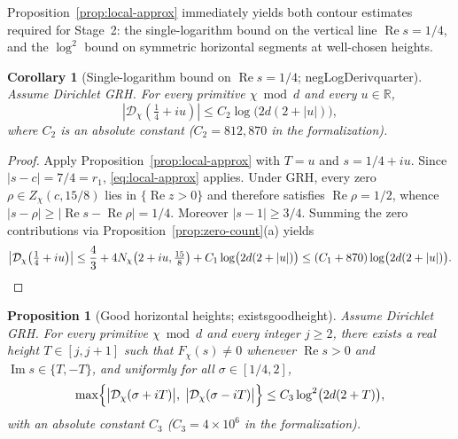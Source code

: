 \documentclass[11pt,reqno]{amsart}
\numberwithin{equation}{section}
\newtheorem{proposition}[theorem]{Proposition}
\newtheorem{corollary}[theorem]{Corollary}
\theoremstyle{definition}
\newcommand{\R}{\mathbb{R}}
\newcommand{\1}{\mathbf{1}}
\newcommand{\D}{\mathcal{D}}
\renewcommand{\Re}{\operatorname{Re}}
\renewcommand{\Im}{\operatorname{Im}}
\newcommand{\lean}[1]{{\footnotesize\ttfamily\renewcommand{\_}{\textunderscore\allowbreak}#1}}
\newcommand{\GRH}{\textup{GRH}}
\begin{document}
Proposition~\ref{prop:local-approx} immediately yields both contour estimates required for Stage~2: the single-logarithm bound on the vertical line $\Re s = 1/4$, and the $\log^2$ bound on symmetric horizontal segments at well-chosen heights.

\begin{corollary}[Single-logarithm bound on $\Re s = 1/4$; \lean{negLogDeriv\_quarter}]
\label{cor:quarter-line}
Assume Dirichlet \GRH{}. For every primitive $\chi \bmod d$ and every $u \in \R$,
\begin{equation}\label{eq:quarter-line}
  \left|\D_\chi\!\left(\tfrac{1}{4} + i u\right)\right| \le C_2 \log\bigl(2 d (2 + |u|)\bigr),
\end{equation}
where $C_2$ is an absolute constant ($C_2 = 812{,}870$ in the formalization).
\end{corollary}

\begin{proof}
Apply Proposition~\ref{prop:local-approx} with $T = u$ and $s = 1/4 + iu$. Since $|s - c| = 7/4 = r_1$, \eqref{eq:local-approx} applies. Under \GRH{}, every zero $\rho \in Z_\chi(c, 15/8)$ lies in $\{\Re z > 0\}$ and therefore satisfies $\Re \rho = 1/2$, whence $|s - \rho| \ge |\Re s - \Re \rho| = 1/4$. Moreover $|s - 1| \ge 3/4$. Summing the zero contributions via Proposition~\ref{prop:zero-count}(a) yields
\[
  \left|\D_\chi\!\left(\tfrac{1}{4} + iu\right)\right|
  \le \frac{4}{3} + 4 N_\chi\!\left(2+iu, \tfrac{15}{8}\right) + C_1 \log\bigl(2d(2+|u|)\bigr)
  \le (C_1 + 870) \log\bigl(2d(2+|u|)\bigr). \qedhere
\]
\end{proof}

\begin{proposition}[Good horizontal heights; \lean{exists\_good\_height}]
\label{prop:good-height}
Assume Dirichlet \GRH{}. For every primitive $\chi \bmod d$ and every integer $j \ge 2$, there exists a real height $T \in [j, j+1]$ such that $F_\chi(s) \neq 0$ whenever $\Re s > 0$ and $\Im s \in \{T, -T\}$, and uniformly for all $\sigma \in [1/4, 2]$,
\begin{equation}\label{eq:good-height}
  \max\Bigl\{\bigl|\D_\chi(\sigma + iT)\bigr|,\; \bigl|\D_\chi(\sigma - iT)\bigr|\Bigr\}
  \le C_3 \log^2\bigl(2 d (2 + T)\bigr),
\end{equation}
with an absolute constant $C_3$ ($C_3 = 4 \times 10^6$ in the formalization).
\end{proposition}
\end{document}
